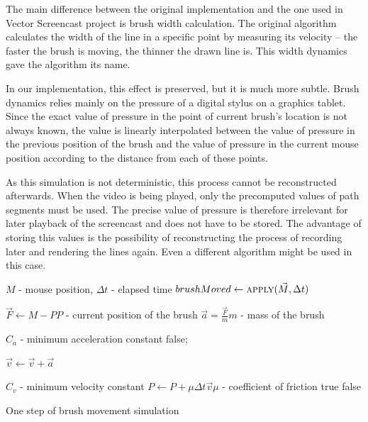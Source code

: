 The main difference between the original implementation and the one used in Vector Screencast project is brush width calculation. The original algorithm calculates the width of the line in a specific point by measuring its velocity -- the faster the brush is moving, the thinner the drawn line is. This width dynamics gave the algorithm its name.

In our implementation, this effect is preserved, but it is much more subtle. Brush dynamics relies mainly on the pressure of a digital stylus on a graphics tablet. Since the exact value of pressure in the point of current brush's location is not always known, the value is linearly interpolated between the value of pressure in the previous position of the brush and the value of pressure in the current mouse position according to the distance from each of these points.

As this simulation is not deterministic, this process cannot be reconstructed afterwards. When the video is being played, only the precomputed values of path segments must be used. The precise value of pressure is therefore irrelevant for later playback of the screencast and does not have to be stored. The advantage of storing this values is the possibility of reconstructing the process of recording later and rendering the lines again. Even a different algorithm might be used in this case.

\begin{pseudocode}
  \begin{algorithmic}

  	 \Comment $M$ - mouse position, $\Delta t$ - elapsed time
	      \State $brushMoved \gets \Call{apply}{\vec{M}, \Delta t} $
              \State {}
          \EndIf
      \EndIf
 	\EndFunction

      \State $ \vec{F} \gets M - P $\Comment $P$ - current position of the brush
      \State $ \vec{a} = \frac{\vec{F}}{m} $\Comment $m$ - mass of the brush

       \Comment $C_a$ - minimum acceleration constant
	      \State \Return false;    
       \EndIf
      
      \State $\vec{v} \gets \vec{v} + \vec{a}$

       \Comment $C_v$ - minimum velocity constant
          \State $ P \gets P + \mu\Delta t\vec{v} $\Comment $\mu$ - coefficient of friction
		  \State \Return true
      \EndIf
      \State \Return false
  	\EndFunction
  \end{algorithmic}
\caption{One step of brush movement simulation}
\label{alg:one-step}
\end{pseudocode}

